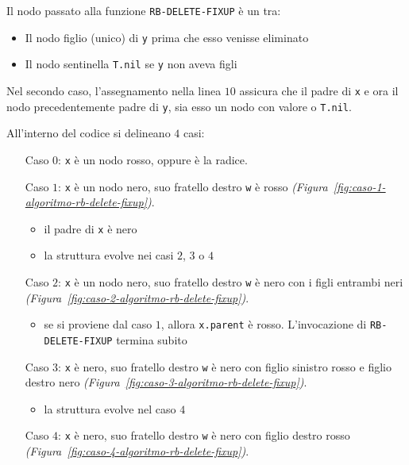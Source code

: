\documentclass[italian, 10pt]{article}
\begin{document}
\bigskip
Il nodo passato alla funzione \texttt{RB-DELETE-FIXUP} è un tra:

\begin{itemize}
  \item Il nodo figlio (unico) di \texttt{y} prima che esso venisse eliminato
  \item Il nodo sentinella \texttt{T.nil} se \texttt{y} non aveva figli
\end{itemize}

Nel secondo caso, l'assegnamento nella linea \(10\) assicura che il padre di \texttt{x} e ora il nodo precedentemente padre di \texttt{y}, sia esso un nodo con valore o \texttt{T.nil}.

All'interno del codice si delineano \(4\) casi:

\begin{itemize}
  \item[Caso \(0\):] \texttt{x} è un nodo rosso, oppure è la radice.
  \item[Caso \(1\):] \texttt{x} è un nodo nero, suo fratello destro \texttt{w} è rosso \textit{(Figura~\ref{fig:caso-1-algoritmo-rb-delete-fixup})}.
    \begin{itemize}
      \item il padre di \texttt{x} è nero
      \item la struttura evolve nei casi \(2\), \(3\) o \(4\)
    \end{itemize}
  \item[Caso \(2\):] \texttt{x} è un nodo nero, suo fratello destro \texttt{w} è nero con i figli entrambi neri \textit{(Figura~\ref{fig:caso-2-algoritmo-rb-delete-fixup})}.
    \begin{itemize}
      \item se si proviene dal caso \(1\), allora \texttt{x.parent} è rosso. L'invocazione di \texttt{RB-DELETE-FIXUP} termina subito
    \end{itemize}
  \item[Caso \(3\):] \texttt{x} è nero, suo fratello destro \texttt{w} è nero con figlio sinistro rosso e figlio destro nero \textit{(Figura~\ref{fig:caso-3-algoritmo-rb-delete-fixup})}.
    \begin{itemize}
      \item la struttura evolve nel caso \(4\)
    \end{itemize}
  \item[Caso \(4\):] \texttt{x} è nero, suo fratello destro \texttt{w} è nero con figlio destro rosso \textit{(Figura~\ref{fig:caso-4-algoritmo-rb-delete-fixup})}.
\end{itemize}
\end{document}

